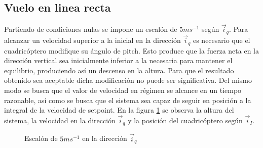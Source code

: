 \documentclass[main]{subfiles}
\begin{document}
\subsection{Vuelo en linea recta}
Partiendo de condiciones nulas se impone un escal\'on de $5m s ^{-1}$ seg\'un $\vec{i}_q$. Para alcanzar un velocidad superior a la inicial en la direcci\'on $\vec{i}_q$ es necesario que el cuadric\'optero modifique su \'angulo de pitch. Esto produce que la fuerza neta en la direcci\'on vertical sea inicialmente inferior a la necesaria para mantener el equilibrio, produciendo as\'i un descenso en la altura. Para que el resultado obtenido sea aceptable dicha modificaci\'on no puede ser significativa. Del mismo modo se busca que el valor de velocidad en r\'egimen se alcance en un tiempo razonable, as\'i como se busca que el sistema sea capaz de seguir en posici\'on a la integral de la velocidad de setpoint. En la figura \ref{fig:rec_esc_x} se observa la altura del sistema, la velocidad en la direcci\'on $\vec{i}_q$ y la posici\'on del cuadric\'optero seg\'un $\vec{i}_I$. 

\begin{figure}[h!]
  \centering
 
  \caption{Escal\'on de $5m s^{-1}$ en la direcci\'on $\vec{i}_q$}
  \label{fig:rec_esc_x}
\end{figure}
\end{document}
